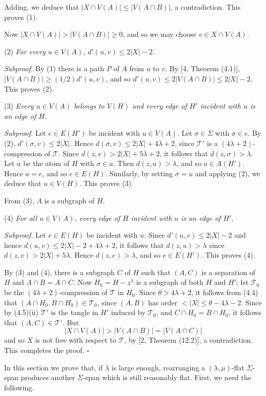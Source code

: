 Adding, we deduce that $|X \cap V(A)| \le |V(A \cap B)|$, a contradiction. This proves (1).

Now $|X \cap V(A)| > |V(A \cap B)| \ge 0$, and so we may choose $v \in X \cap V(A)$.

\hspace*{12pt}(2) \textit{For every $u \in V(A)$, $d'(u, v) \le 2|X| - 2$.}

\textit{Subproof.} By (1) there is a path $P$ of $A$ from $u$ to $v$. By [4, Theorem (4.1)], $|V(A \cap B)| \ge (1/2)d'(u, v)$, and so $d'(u, v) \le 2|V(A \cap B)| \le 2|X| - 2$. This proves (2).

\hspace*{12pt}(3) \textit{Every $u \in V(A)$ belongs to $V(H)$ and every edge of $H'$ incident with $u$ is an edge of $H$.}

\textit{Subproof.} Let $e \in E(H')$ be incident with $u \in V(A)$. Let $\sigma \in \Sigma$ with $\sigma \in e$. By (2), $d'(\sigma, v) \le 2|X|$. Hence $d(\sigma, v) \le 2|X| + 4\lambda + 2$, since $\mathscr{T}'$ is a $(4\lambda + 2)$-compression of $\mathscr{T}$. Since $d(z, v) > 2|X| + 5\lambda + 2$, it follows that $d(z, \sigma) > \lambda$. Let $a$ be the atom of $H$ with $\sigma \in a$. Then $d(z, a) > \lambda$, and so $a \in A(H')$. Hence $a = e$, and so $e \in E(H)$. Similarly, by setting $\sigma = u$ and applying (2), we deduce that $u \in V(H)$. This proves (3).

From (3), $A$ is a subgraph of $H$.

\hspace*{12pt}(4) \textit{For all $u \in V(A)$, every edge of $H$ incident with $u$ is an edge of $H'$.}

\textit{Subproof.} Let $e \in E(H)$ be incident with $u$. Since $d'(u, v) \le 2|X| - 2$ and hence $d(u, v) \le 2|X| - 2 + 4\lambda + 2$, it follows that $d(z, u) > \lambda$ since $d(z, v) > 2|X| + 5\lambda$. Hence $d(z, e) > \lambda$, and so $e \in E(H')$. This proves (4).

By (3) and (4), there is a subgraph $C$ of $H$ such that $(A, C)$ is a separation of $H$ and $A \cap B = A \cap C$. Now $H_0 = H - z^\lambda$ is a subgraph of both $H$ and $H'$; let $\mathscr{T}_0$ be the $(4\lambda + 2)$-compression of $\mathscr{T}$ in $H_0$. Since $\theta > 4\lambda + 2$, it follows from (4.4) that $(A \cap H_0, B \cap H_0) \in \mathscr{T}_0$, since $(A, B)$ has order $< |X| \le \theta - 4\lambda - 2$. Since by (4.5)(ii) $\mathscr{T}'$ is the tangle in $H'$ induced by $\mathscr{T}_0$, and $C \cap H_0 = B \cap H_0$, it follows that $(A, C) \in \mathscr{T}'$. But
\begin{equation*}
|X \cap V(A)| > |V(A \cap B)| = |V(A \cap C)|
\end{equation*}
and so $X$ is not free with respect to $\mathscr{T}$, by [2, Theorem (12.2)], a contradiction. This completes the proof. $\square$


In this section we prove that, if $\lambda$ is large enough, rearranging a $(\lambda, \mu)$-flat $\Sigma$-span produces another $\Sigma$-span which is still reasonably flat. First, we need the following.
